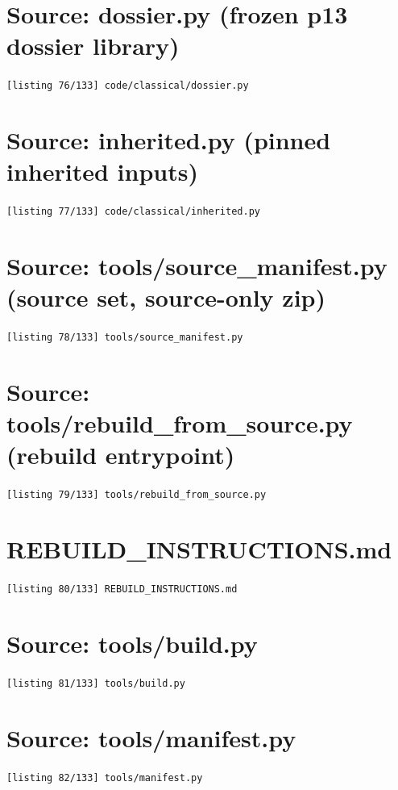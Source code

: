 \section{Source: dossier.py (frozen p13 dossier library)}
\noindent\texttt{[listing 76/133] code/classical/dossier.py}
{\scriptsize}

\section{Source: inherited.py (pinned inherited inputs)}
\noindent\texttt{[listing 77/133] code/classical/inherited.py}
{\scriptsize}

\section{Source: tools/source\_manifest.py (source set, source-only zip)}
\noindent\texttt{[listing 78/133] tools/source\_manifest.py}
{\scriptsize}

\section{Source: tools/rebuild\_from\_source.py (rebuild entrypoint)}
\noindent\texttt{[listing 79/133] tools/rebuild\_from\_source.py}
{\scriptsize}

\section{REBUILD\_INSTRUCTIONS.md}
\noindent\texttt{[listing 80/133] REBUILD\_INSTRUCTIONS.md}
{\scriptsize}

\section{Source: tools/build.py}
\noindent\texttt{[listing 81/133] tools/build.py}
{\scriptsize}

\section{Source: tools/manifest.py}
\noindent\texttt{[listing 82/133] tools/manifest.py}
{\scriptsize}

